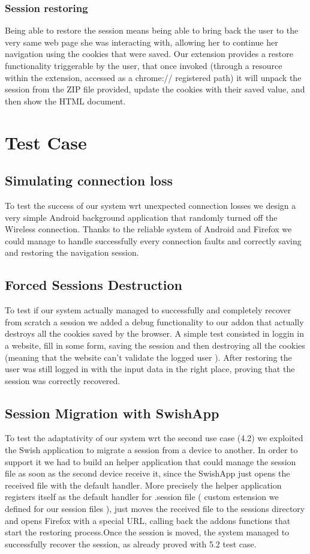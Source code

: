 \documentclass[11pt,a4paper]{article}
\begin{document}
\subsubsection{Session restoring}
Being able to restore the session means being able to bring back the user to the very same web page she was interacting with, allowing her to continue her navigation using the cookies that were saved. 
Our extension provides a restore functionality triggerable by the user, that once invoked (through a resource within the extension, accessed as a chrome:// registered path) it will unpack the session from the ZIP file provided, update the cookies with their saved value, and then show the HTML document.

\section{Test Case} 
\subsection{Simulating connection loss}
To test the success of our system wrt unexpected connection losses we design a very simple Android background application that randomly turned off the Wireless connection. Thanks to the reliable  system of Android and Firefox we could manage to handle successfully every connection faults and correctly saving and restoring the navigation session.
\subsection{Forced Sessions Destruction}
To test if our system actually managed to successfully and completely recover from scratch a session we added a debug functionality to our addon that actually destroys all the cookies saved by the browser.
A simple test consisted in loggin in a website, fill in some form, saving the session and then destroying all the cookies (meaning that  the website can’t validate the logged user ).  After restoring the user was still logged in with the input data in the right place,  proving that the session was correctly recovered.
\subsection{Session Migration with SwishApp}
To test the adaptativity of our system wrt the second use case (4.2) we exploited the Swish application to migrate a session from a device to another. In order to support it we had to build an helper application that could manage the session file as soon as the second device receive it, since the SwishApp just opens the received file with the default handler.
More precisely the helper application registers itself as the default handler for .session file ( custom estension we defined for our session files ), just moves the received file to the sessions directory and opens Firefox with a special URL, calling back  the addons functions that start the restoring process.Once the session is moved, the system managed to successfully recover the session, as already proved with 5.2 test case.
\end{document}
